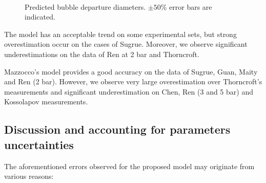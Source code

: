 \begin{figure}[h!]
\centering
{}
\\

\caption{Predicted bubble departure diameters. $\pm 50\%$ error bars are indicated.}
\label{fig:pred_nosensi}
\end{figure}

\npar


The model has an acceptable trend on some experimental sets, but strong overestimation occur on the cases of Sugrue. Moreover, we observe significant underestimations on the data of Ren at 2 bar and Thorncroft.

Mazzocco's model provides a good accuracy on the data of Sugrue, Guan, Maity and Ren (2 bar). However, we observe very large overestimation over Thorncroft's measurements and significant underestimation on Chen, Ren (3 and 5 bar) and Kossolapov measurements. 



\subsection{Discussion and accounting for parameters uncertainties}


The aforementioned errors observed for the proposed model may originate from various reasons:

